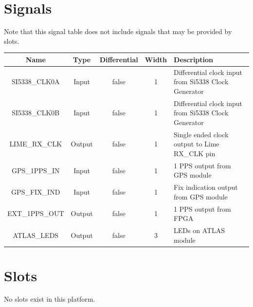 \documentclass{article}
\begin{document}
\section*{Signals}
Note that this signal table does not include signals that may be provided by slots. \\
\begin{tabular}{|c|c|c|c|p{8cm}|}
	\hline
	\rowcolor{blue}
	Name           & Type   & Differential & Width & Description                                          \\
	\hline
	SI5338\_CLK0A  & Input  & false        & 1     & Differential clock input from Si5338 Clock Generator \\
	\hline
	SI5338\_CLK0B  & Input  & false        & 1     & Differential clock input from Si5338 Clock Generator \\
	\hline
	LIME\_RX\_CLK  & Output & false        & 1     & Single ended clock output to Lime RX\_CLK pin        \\
	\hline
	GPS\_1PPS\_IN  & Input  & false        & 1     & 1 PPS output from GPS module                         \\
	\hline
	GPS\_FIX\_IND  & Input  & false        & 1     & Fix indication output from GPS module                \\
	\hline
	EXT\_1PPS\_OUT & Output & false        & 1     & 1 PPS output from FPGA                               \\
	\hline
	ATLAS\_LEDS    & Output & false        & 3     & LEDs on ATLAS module                                 \\
	\hline
\end{tabular}
\pagebreak
\section*{Slots}
No slots exist in this platform.
\end{document}

